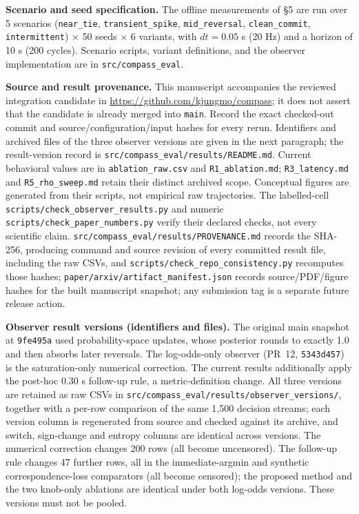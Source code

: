 \documentclass[11pt]{article}
\newcommand{\code}[1]{\texttt{#1}}
\begin{document}
\textbf{Scenario and seed specification.} The offline measurements of \S5 are run over 5 scenarios (\code{near\_tie}, \code{transient\_spike}, \code{mid\_reversal}, \code{clean\_commit}, \code{intermittent}) $\times$ 50 seeds $\times$ 6 variants, with $dt = 0.05$ s (20 Hz) and a horizon of 10 s (200 cycles). Scenario scripts, variant definitions, and the observer implementation are in \code{src/compass\_eval}.

\textbf{Source and result provenance.} This manuscript accompanies the reviewed integration candidate in \url{https://github.com/kjungmo/compass}; it does not assert that the candidate is already merged into \code{main}. Record the exact checked-out commit and source/configuration/input hashes for every rerun. Identifiers and archived files of the three observer versions are given in the next paragraph; the result-version record is \code{src/compass\_eval/results/README.md}. Current behavioral values are in \code{ablation\_raw.csv} and \code{R1\_ablation.md}; \code{R3\_latency.md} and \code{R5\_rho\_sweep.md} retain their distinct archived scope. Conceptual figures are generated from their scripts, not empirical raw trajectories. The labelled-cell \code{scripts/check\_observer\_results.py} and numeric \code{scripts/check\_paper\_numbers.py} verify their declared checks, not every scientific claim. \code{src/compass\_eval/results/PROVENANCE.md} records the SHA-256, producing command and source revision of every committed result file, including the raw CSVs, and \code{scripts/check\_repo\_consistency.py} recomputes those hashes; \code{paper/arxiv/artifact\_manifest.json} records source/PDF/figure hashes for the built manuscript snapshot; any submission tag is a separate future release action.

\textbf{Observer result versions (identifiers and files).} The original main snapshot at \code{9fe495a} used probability-space updates, whose posterior rounds to exactly 1.0 and then absorbs later reversals. The log-odds-only observer (PR~12, \code{5343d457}) is the saturation-only numerical correction. The current results additionally apply the post-hoc 0.30 s follow-up rule, a metric-definition change. All three versions are retained as raw CSVs in \code{src/compass\_eval/results/observer\_versions/}, together with a per-row comparison of the same 1,500 decision streams; each version column is regenerated from source and checked against its archive, and switch, sign-change and entropy columns are identical across versions. The numerical correction changes 200 rows (all become uncensored). The follow-up rule changes 47 further rows, all in the immediate-argmin and synthetic correspondence-loss comparators (all become censored); the proposed method and the two knob-only ablations are identical under both log-odds versions. These versions must not be pooled.
\end{document}
